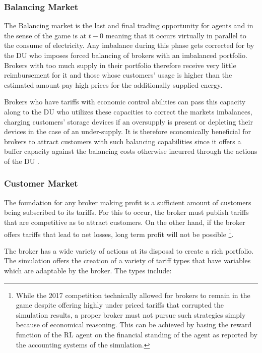 \subsubsection{Balancing Market}
The Balancing market is the last and final trading opportunity for agents and in the sense of the game is at $t-0$ meaning that it occurs virtually in parallel to the consume of electricity. Any imbalance during this phase gets corrected for by the \ac{DU} who imposes forced balancing of brokers with an imbalanced portfolio. Brokers with too much supply in their portfolio therefore receive very little reimbursement for it and those whose customers' usage is higher than the estimated amount pay high prices for the additionally supplied energy. 

Brokers who have tariffs with economic control abilities can pass this capacity along to the \ac{DU} who utilizes these capacities to correct the markets imbalances, charging customers' storage devices if an oversupply is present or depleting their devices in the case of an under-supply. It is therefore economically beneficial for brokers to attract customers with such balancing capabilities since it offers a buffer capacity against the balancing costs otherwise incurred through the actions of the \ac{DU} \citep[p.5]{ketter2018powertac} .  





\subsubsection{Customer Market}

The foundation for any broker making profit is a sufficient amount of customers being subscribed to its tariffs. For this to occur, the broker must publish tariffs that are competitive as to attract customers. On the other hand, if the broker offers tariffs that lead to net losses, long term profit will not be possible
\footnote{While the 2017 competition technically allowed for brokers to remain in the game despite offering highly under priced tariffs that corrupted the simulation results, a proper broker must not pursue such strategies simply because of economical reasoning. %
This can be achieved by basing the reward function of the \ac{RL} agent on the financial standing of the agent as reported by the accounting systems of the simulation.}.

The broker has a wide variety of actions at its disposal to create a rich portfolio. The simulation offers the creation of a variety of tariff types that have variables which are adaptable by the broker. The types include:
	
